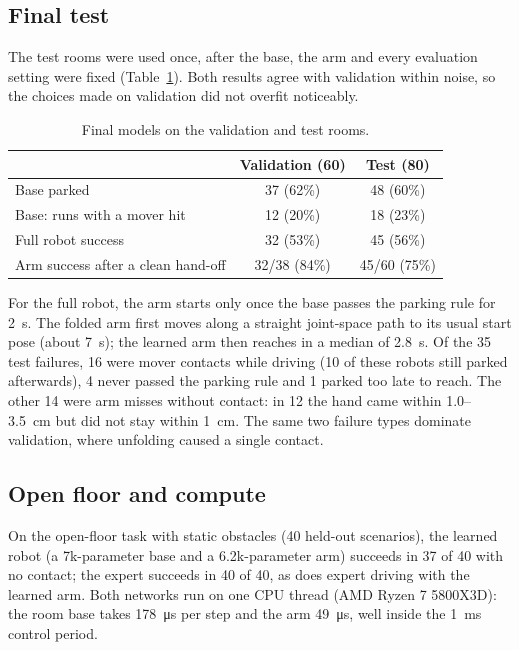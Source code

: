 \subsection{Final test}
The test rooms were used once, after the base, the arm and every evaluation setting were fixed
(Table~\ref{tab:test}). Both results agree with validation within noise, so the choices made on validation did not
overfit noticeably.

\begin{table}[t]
\centering
\caption{Final models on the validation and test rooms.}
\label{tab:test}
\begin{tabular}{lcc}
\toprule
 & Validation (60) & Test (80) \\
\midrule
Base parked                            & 37 (62\%) & 48 (60\%) \\ %
Base: runs with a mover hit            & 12 (20\%) & 18 (23\%) \\
Full robot success                     & 32 (53\%) & 45 (56\%) \\ %
Arm success after a clean hand-off     & 32/38 (84\%) & 45/60 (75\%) \\
\bottomrule
\end{tabular}
\end{table}

For the full robot, the arm starts only once the base passes the parking rule for \SI{2}{s}. The folded arm first
moves along a straight joint-space path to its usual start pose (about \SI{7}{s}); the learned arm then reaches in a
median of \SI{2.8}{s}. Of the 35 test failures, 16 were mover contacts while driving (10 of these robots still parked
afterwards), 4 never passed the parking rule and 1 parked too late to reach. The other 14 were arm misses without
contact: in 12 the hand came within 1.0--\SI{3.5}{cm} but did not stay within \SI{1}{cm}. The same two failure types
dominate validation, where unfolding caused a single contact.

\subsection{Open floor and compute}
On the open-floor task with static obstacles (40 held-out scenarios), the learned robot (a 7k-parameter base
and a 6.2k-parameter arm) succeeds in 37 of 40 with no contact; the expert succeeds in 40 of 40, as does expert
driving with the learned arm. %
Both networks run on one CPU thread (AMD Ryzen 7 5800X3D): the room base takes \SI{178}{\micro s} per step
and the arm \SI{49}{\micro s}, well inside the \SI{1}{ms} control period. %

